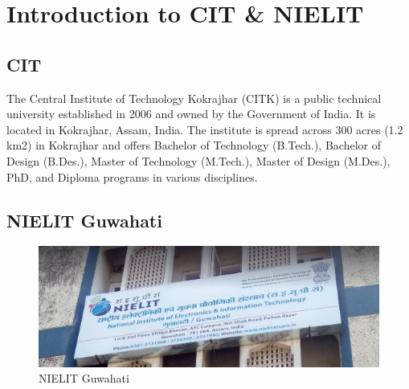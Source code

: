 \documentclass[12pt, a4paper, oneside]{Thesis} %
\begin{document}

\chapter{Introduction to CIT \& NIELIT} %

\label{Chapter0} %



\section*{CIT}
The Central Institute of Technology Kokrajhar (CITK) is a public technical university established in 2006 and owned by the Government of India. It is located in Kokrajhar, Assam, India. The institute is spread across 300 acres (1.2 km2) in Kokrajhar and offers Bachelor of Technology (B.Tech.), Bachelor of Design (B.Des.), Master of Technology (M.Tech.), Master of Design (M.Des.), PhD, and Diploma programs in various disciplines.\cite{enwiki:citk}






\section*{NIELIT Guwahati}

\begin{figure}[!htbp]
\centering
\includegraphics[width=15cm]{nielit.jpeg}
\caption{NIELIT Guwahati}
\label{fignielit}
\end{figure}
\end{document}
